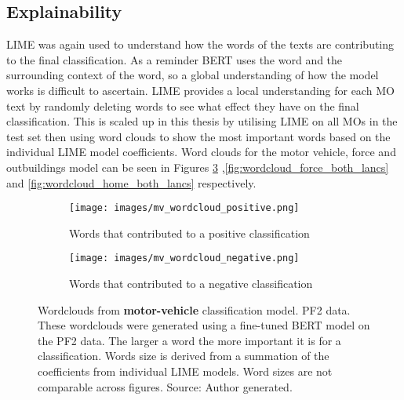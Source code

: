 \subsection{Explainability} LIME was again used to understand how the words of the texts are contributing to the final classification. As a reminder BERT uses the word and the surrounding context of the word, so a global understanding of how the model works is difficult to ascertain. LIME provides a local understanding for each MO text by randomly deleting words to see what effect they have on the final classification. This is scaled up in this thesis by utilising LIME on all MOs in the test set then using word clouds to show the most important words based on the individual LIME model coefficients. Word clouds for the motor vehicle, force and outbuildings model can be seen in Figures \ref{fig:wordcloud_mv_both_lancs} ,\ref{fig:wordcloud_force_both_lancs} and \ref{fig:wordcloud_home_both_lancs} respectively.

\begin{figure}
     \centering
     \begin{subfigure}[b]{0.9\textwidth}
         \centering
         \texttt{[image: images/mv\_wordcloud\_positive.png]}
         \caption{Words that contributed to a positive classification}
         \label{fig: wordcloud_mv_lancs}
     \end{subfigure}
     \vfill
     \begin{subfigure}[b]{0.9\textwidth}
         \centering
         \texttt{[image: images/mv\_wordcloud\_negative.png]}
         \caption{Words that contributed to a negative classification}
         \label{fig: wordcloud_mv_rev_lancs}
     \end{subfigure}
        \caption[Wordclouds from  \textbf{motor-vehicle} classification model. PF2 data.]{{Wordclouds from  \textbf{motor-vehicle} classification model. PF2 data.} These wordclouds were generated using a fine-tuned BERT model on the PF2 data. The larger a word the more important it is for a classification. Words size is derived from a summation of the coefficients from individual LIME models. Word sizes are not comparable across figures. Source: Author generated.}
        \label{fig:wordcloud_mv_both_lancs}
        
\end{figure}


